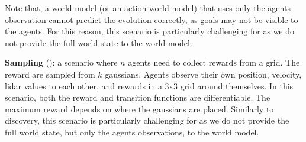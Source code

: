 \begin{compactitem}
         Note that, a world model (or an action world model) that uses only the agents observation cannot predict the evolution correctly, as goals may not be visible to the agents. For this reason, this scenario is particularly challenging for \fname{} as we do not provide the full world state to the world model.
     \item \textbf{Sampling} (): 
         a scenario where $n$ agents need to collect rewards from a grid. The reward are sampled from $k$ gaussians. Agents observe their own position, velocity, lidar values to each other, and rewards in a 3x3 grid around themselves.  
         In this scenario, both the reward and transition functions are differentiable. 
         The maximum reward depends on where the gaussians are placed.
         Similarly to discovery, this scenario is particularly challenging for \fname{} as we do not provide the full world state, but only the agents observations, to the world model.
\end{compactitem}



